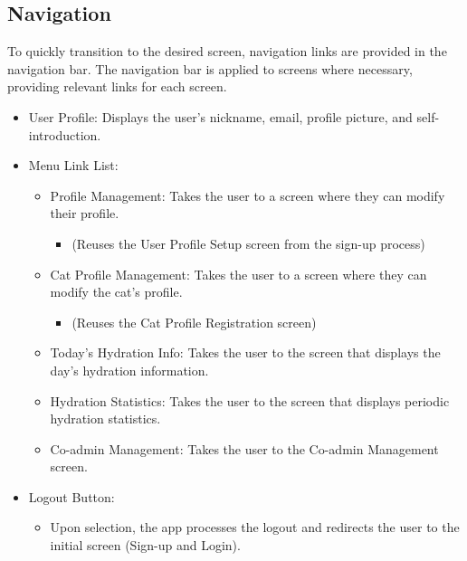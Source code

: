 \documentclass[conference]{IEEEtran}
\begin{document}
\subsection{Navigation}
To quickly transition to the desired screen, navigation links are provided in the navigation bar. The navigation bar is applied to screens where necessary, providing relevant links for each screen.\newline
\begin{itemize}
\item User Profile: Displays the user's nickname, email, profile picture, and self-introduction.
\item Menu Link List:
    \begin{itemize}
        \item Profile Management: Takes the user to a screen where they can modify their profile.
        \begin{itemize}
            \item (Reuses the User Profile Setup screen from the sign-up process)
        \end{itemize}
        \item Cat Profile Management: Takes the user to a screen where they can modify the cat's profile.
        \begin{itemize}
            \item (Reuses the Cat Profile Registration screen)
        \end{itemize}
        \item Today's Hydration Info: Takes the user to the screen that displays the day's hydration information.
        \item Hydration Statistics: Takes the user to the screen that displays periodic hydration statistics.
        \item Co-admin Management: Takes the user to the Co-admin Management screen.
    \end{itemize}
    \item Logout Button:
    \begin{itemize}
        \item Upon selection, the app processes the logout and redirects the user to the initial screen (Sign-up and Login).\\
    \end{itemize}
\end{itemize}
\end{document}
